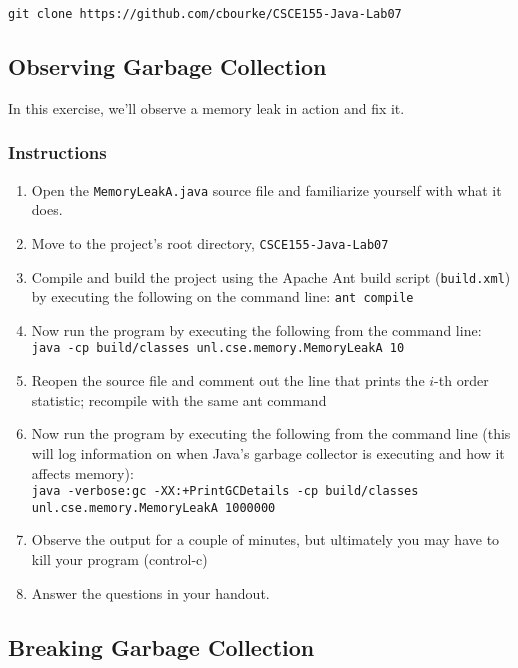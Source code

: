 \documentclass[12pt]{scrartcl}
\begin{document}
\texttt{git clone https://github.com/cbourke/CSCE155-Java-Lab07}

\subsection{Observing Garbage Collection}

In this exercise, we'll observe a memory leak in action and fix it.

\subsubsection*{Instructions}
\begin{enumerate}
  \item Open the \texttt{MemoryLeakA.java} source file and 
  	familiarize yourself with what it does.  
  \item Move to the project's root directory, \texttt{CSCE155-Java-Lab07}
  \item Compile and build the project using the Apache Ant build script 
	(\texttt{build.xml}) by executing the following on the command 
	line: \texttt{ant compile}
  \item Now run the program by executing the following from the command line:\\
	\texttt{java -cp build/classes unl.cse.memory.MemoryLeakA 10}
  \item Reopen the source file and comment out the line that prints the $i$-th 
	order statistic; recompile with the same ant command
  \item Now run the program by executing the following from the command line 
	(this will log information on when Java's garbage collector is executing 
	and how it affects memory):\\
	\texttt{java -verbose:gc -XX:+PrintGCDetails -cp build/classes unl.cse.memory.MemoryLeakA 1000000}

  \item Observe the output for a couple of minutes, but ultimately you may 
	have to kill your program (control-c)
  \item Answer the questions in your handout.
\end{enumerate}

\subsection{Breaking Garbage Collection}
\end{document}
